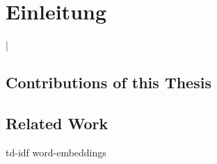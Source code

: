\documentclass[german,version-2020-11]{uzl-thesis}
\begin{document}
%
%


\chapter{Einleitung}%


%

\lstMakeShortInline[style=code,style=inline,language={[LaTeX]tex},moretexcs={chapter}]|



\section{Contributions of this Thesis}



\section{Related Work}
td-idf
word-embeddings
\end{document}
